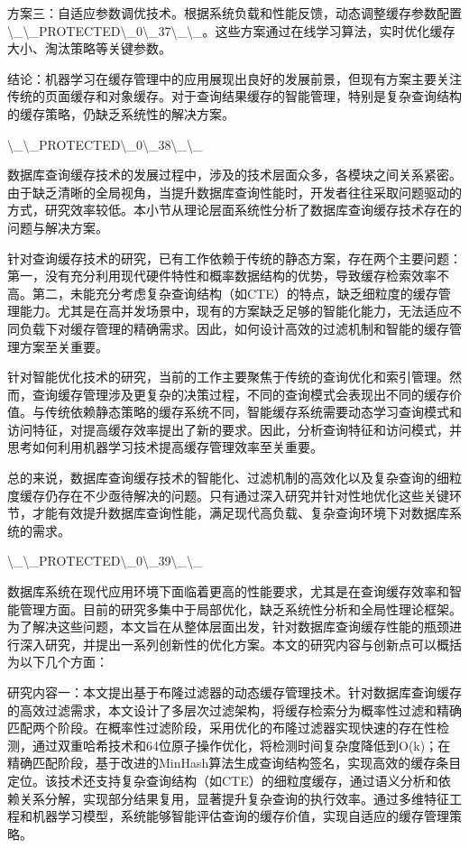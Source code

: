 方案三：自适应参数调优技术。根据系统负载和性能反馈，动态调整缓存参数配置\textbackslash{}_\textbackslash{}_PROTECTED\textbackslash{}_0\textbackslash{}_37\textbackslash{}_\textbackslash{}_。这些方案通过在线学习算法，实时优化缓存大小、淘汰策略等关键参数。

结论：机器学习在缓存管理中的应用展现出良好的发展前景，但现有方案主要关注传统的页面缓存和对象缓存。对于查询结果缓存的智能管理，特别是复杂查询结构的缓存策略，仍缺乏系统性的解决方案。

\textbackslash{}_\textbackslash{}_PROTECTED\textbackslash{}_0\textbackslash{}_38\textbackslash{}_\textbackslash{}_

数据库查询缓存技术的发展过程中，涉及的技术层面众多，各模块之间关系紧密。由于缺乏清晰的全局视角，当提升数据库查询性能时，开发者往往采取问题驱动的方式，研究效率较低。本小节从理论层面系统性分析了数据库查询缓存技术存在的问题与解决方案。

针对查询缓存技术的研究，已有工作依赖于传统的静态方案，存在两个主要问题：第一，没有充分利用现代硬件特性和概率数据结构的优势，导致缓存检索效率不高。第二，未能充分考虑复杂查询结构（如CTE）的特点，缺乏细粒度的缓存管理能力。尤其是在高并发场景中，现有的方案缺乏足够的智能化能力，无法适应不同负载下对缓存管理的精确需求。因此，如何设计高效的过滤机制和智能的缓存管理方案至关重要。

针对智能优化技术的研究，当前的工作主要聚焦于传统的查询优化和索引管理。然而，查询缓存管理涉及更复杂的决策过程，不同的查询模式会表现出不同的缓存价值。与传统依赖静态策略的缓存系统不同，智能缓存系统需要动态学习查询模式和访问特征，对提高缓存效率提出了新的要求。因此，分析查询特征和访问模式，并思考如何利用机器学习技术提高缓存管理效率至关重要。

总的来说，数据库查询缓存技术的智能化、过滤机制的高效化以及复杂查询的细粒度缓存仍存在不少亟待解决的问题。只有通过深入研究并针对性地优化这些关键环节，才能有效提升数据库查询性能，满足现代高负载、复杂查询环境下对数据库系统的需求。

\textbackslash{}_\textbackslash{}_PROTECTED\textbackslash{}_0\textbackslash{}_39\textbackslash{}_\textbackslash{}_

数据库系统在现代应用环境下面临着更高的性能要求，尤其是在查询缓存效率和智能管理方面。目前的研究多集中于局部优化，缺乏系统性分析和全局性理论框架。为了解决这些问题，本文旨在从整体层面出发，针对数据库查询缓存性能的瓶颈进行深入研究，并提出一系列创新性的优化方案。本文的研究内容与创新点可以概括为以下几个方面：

研究内容一：本文提出基于布隆过滤器的动态缓存管理技术。针对数据库查询缓存的高效过滤需求，本文设计了多层次过滤架构，将缓存检索分为概率性过滤和精确匹配两个阶段。在概率性过滤阶段，采用优化的布隆过滤器实现快速的存在性检测，通过双重哈希技术和64位原子操作优化，将检测时间复杂度降低到O(k)；在精确匹配阶段，基于改进的MinHash算法生成查询结构签名，实现高效的缓存条目定位。该技术还支持复杂查询结构（如CTE）的细粒度缓存，通过语义分析和依赖关系分解，实现部分结果复用，显著提升复杂查询的执行效率。通过多维特征工程和机器学习模型，系统能够智能评估查询的缓存价值，实现自适应的缓存管理策略。

